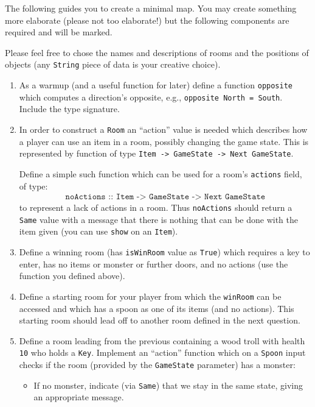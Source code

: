 \documentclass{article}
\newcommand{\topMarks}[1]{\marginnote{(#1 marks)}}
\begin{document}
The following guides you to create a minimal map. You may create
something more elaborate (please not too elaborate!) but the following
components are required and will be marked.

Please feel free to chose the names and descriptions of rooms and the
positions of objects (any \texttt{String} piece of data is
your creative choice).

\begin{enumerate}
\item \topMarks{3} As a warmup (and a useful function for later)
  define a function \texttt{opposite} which computes a direction's
  opposite, e.g., \texttt{opposite North = South}. Include the type signature.

  \item \topMarks{3} In order to construct a \texttt{Room} an
  ``action'' value is needed which describes how a player can use an
  item in a room, possibly changing the game state. This is
  represented by function of type \texttt{Item -> GameState -> Next
    GameState}.

Define a simple such function which can be used
  for a room's \texttt{actions} field, of type:
%
\begin{align*}
\texttt{noActions :: Item -> GameState -> Next GameState}
\end{align*}
%
to represent a lack of actions in a room. Thus
\texttt{noActions} should return a \texttt{Same} value with a message that there is
nothing that can be done with the item given (you can use
\texttt{show} on an \texttt{Item}).

\item \topMarks{4} Define a winning room (has \texttt{isWinRoom} value as
  \texttt{True}) which requires a key to enter, has no items or
  monster or further doors, and no actions (use the function you
  defined above).

\item \topMarks{5} Define a starting room for your player from which the
  \texttt{winRoom} can be accessed and which has a spoon as one of its
  items (and no actions). This starting room should lead off to
  another room defined in the next question.

\item \topMarks{12} Define a room leading from the previous containing a wood troll with
  health \texttt{10} who holds a \texttt{Key}.  Implement an
  ``action'' function which on a \texttt{Spoon} input checks if the
  room (provided by the \texttt{GameState} parameter) has a monster:
 \begin{itemize}
 \item If no monster, indicate (via \texttt{Same}) that we stay
   in the same state, giving an appropriate message.


\end{itemize}
\end{enumerate}
\end{document}
